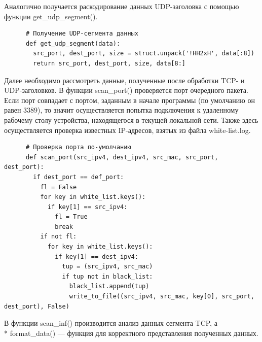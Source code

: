 \documentclass[bachelor, och, coursework]{SCWorks}
\begin{document}
    Аналогично получается раскодирование данных UDP-заголовка с помощью функции get\_udp\_segment().

    \begin{verbatim}
      # Получение UDP-сегмента данных
      def get_udp_segment(data):
        src_port, dest_port, size = struct.unpack('!HH2xH', data[:8])
        return src_port, dest_port, size, data[8:]
    \end{verbatim}      

    Далее необходимо рассмотреть данные, полученные после обработки TCP- и UDP-заголовков. В функции scan\_port() проверяется порт очередного пакета.
    Если порт совпадает с портом, заданным в начале программы (по умолчанию он равен 3389), то значит осуществляется попытка подключения к удаленному рабочему
    столу устройства, находящегося в текущей локальной сети. Также здесь осуществляется проверка известных IP-адресов, взятых из файла white-list.log. 

    \begin{verbatim}
      # Проверка порта по-умолчанию
      def scan_port(src_ipv4, dest_ipv4, src_mac, src_port, dest_port):
        if dest_port == def_port:
          fl = False
          for key in white_list.keys():
            if key[1] == src_ipv4:
              fl = True
              break
          if not fl:
            for key in white_list.keys():
              if key[1] == dest_ipv4:
                tup = (src_ipv4, src_mac)    
                if tup not in black_list:
                  black_list.append(tup)
                  write_to_file((src_ipv4, src_mac, key[0], src_port, dest_port), False)
    \end{verbatim}

    В функции scan\_inf() производится анализ данных сегмента TCP, а \\* format\_data() --- функция для корректного представления полученных данных.
\end{document}
